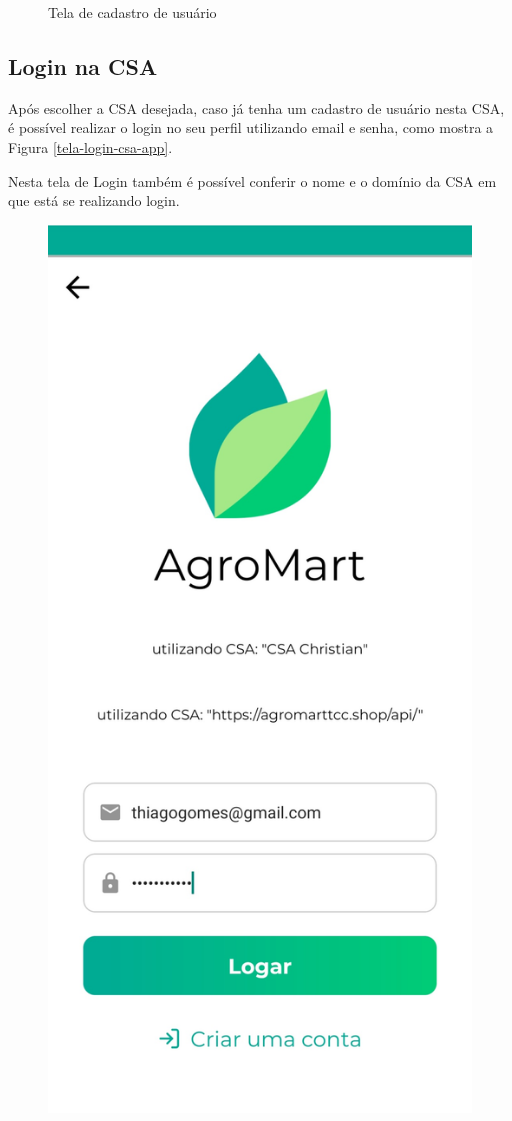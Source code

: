 \begin{figure}[h]
	\caption{Tela de cadastro de usuário}
        \label{tela-signup-csa-app}
\end{figure}

\subsection{Login na CSA}
Após escolher a CSA desejada, caso já tenha um cadastro de usuário nesta CSA, é possível realizar o login no seu perfil utilizando email e senha, como mostra a Figura \ref{tela-login-csa-app}.

Nesta tela de Login também é possível conferir o nome e o domínio da CSA em que está se realizando login.

\begin{figure}[h]
	\centering
	\includegraphics[keepaspectratio=true,scale=0.16]          {figuras/login_app.jpg}

\end{figure}
